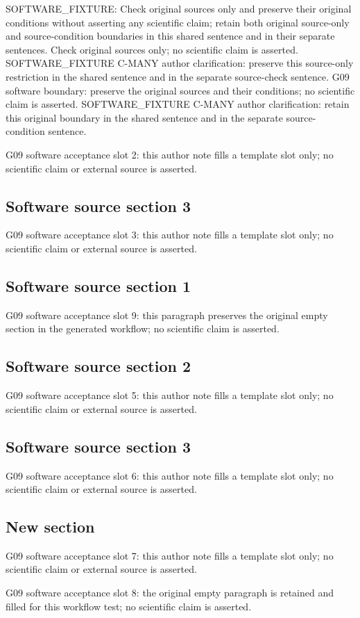 \documentclass[11pt]{article}
\begin{document}
SOFTWARE\_FIXTURE: Check original sources only and preserve their original conditions without asserting any scientific claim; retain both original source-only and source-condition boundaries in this shared sentence and in their separate sentences. \citep{evidence_b5348fa59b3948ae9540b75a33ca9bd9} \citep{evidence_6b169de2b78d452f919391b00916f2c8} Check original sources only; no scientific claim is asserted. SOFTWARE\_FIXTURE C-MANY author clarification: preserve this source-only restriction in the shared sentence and in the separate source-check sentence. \citep{evidence_b5348fa59b3948ae9540b75a33ca9bd9} \citep{evidence_6b169de2b78d452f919391b00916f2c8} G09 software boundary: preserve the original sources and their conditions; no scientific claim is asserted. SOFTWARE\_FIXTURE C-MANY author clarification: retain this original boundary in the shared sentence and in the separate source-condition sentence.

G09 software acceptance slot 2: this author note fills a template slot only; no scientific claim or external source is asserted.

\subsection{Software source section 3}
G09 software acceptance slot 3: this author note fills a template slot only; no scientific claim or external source is asserted.

\subsection{Software source section 1}
G09 software acceptance slot 9: this paragraph preserves the original empty section in the generated workflow; no scientific claim is asserted.

\subsection{Software source section 2}
G09 software acceptance slot 5: this author note fills a template slot only; no scientific claim or external source is asserted.

\subsection{Software source section 3}
G09 software acceptance slot 6: this author note fills a template slot only; no scientific claim or external source is asserted.

\subsection{New section}
G09 software acceptance slot 7: this author note fills a template slot only; no scientific claim or external source is asserted.

G09 software acceptance slot 8: the original empty paragraph is retained and filled for this workflow test; no scientific claim is asserted.



\end{document}
